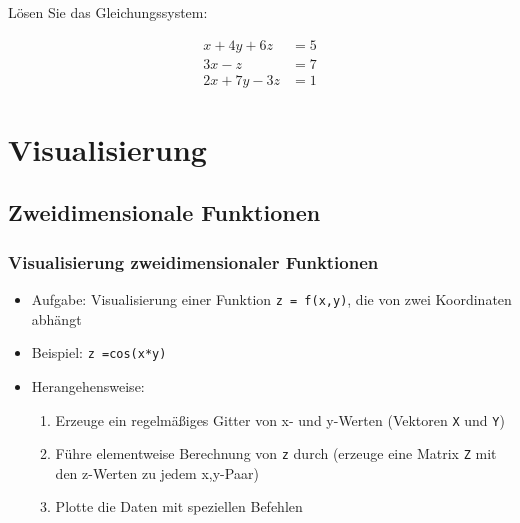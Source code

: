     \secMexercise
    \begin{frame}
        \frameMexercise
        \begin{exercise}
            \sloppy
            Lösen Sie das Gleichungssystem:

            \begin{align*}
                x + 4y + 6z  &= 5 \\
                3x - z &= 7 \\
                2x + 7y -3z &= 1
            \end{align*}

        \end{exercise}
    \end{frame}

    \section{Visualisierung}

    \subsection{Zweidimensionale Funktionen}
    \begin{frame}
        \frametitle{Visualisierung zweidimensionaler Funktionen}
        \begin{itemize}
            \item Aufgabe: Visualisierung einer Funktion \texttt{z = f(x,y)}, die von zwei Koordinaten abhängt
            \item Beispiel: \texttt{z =cos(x*y)}
            \item Herangehensweise:
            \begin{enumerate}
                \item Erzeuge ein regelmäßiges Gitter von x- und y-Werten (Vektoren \texttt{X} und \texttt{Y})
                \item Führe elementweise Berechnung von \texttt{z} durch (erzeuge eine Matrix \texttt{Z} mit den z-Werten zu jedem x,y-Paar)
                \item Plotte die Daten mit speziellen Befehlen
            \end{enumerate}
        \end{itemize}
    \end{frame}

